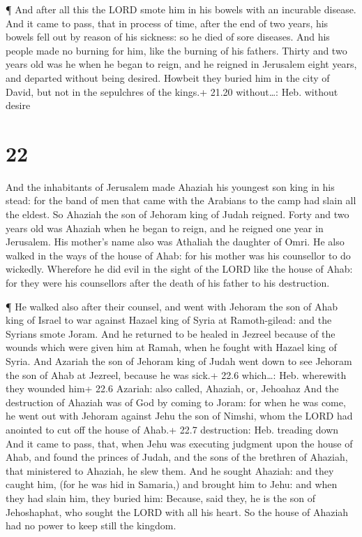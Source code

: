  ¶ And after all this the LORD smote him in his bowels with
an incurable disease.  And it came to pass, that in process
of time, after the end of two years, his bowels fell out by reason of
his sickness: so he died of sore diseases. And his people made no
burning for him, like the burning of his fathers.  Thirty
and two years old was he when he began to reign, and he reigned in
Jerusalem eight years, and departed without being desired. Howbeit they
buried him in the city of David, but not in the sepulchres of the
kings.+ 21.20 without\ldots: Heb. without desire

\hypertarget{section-21}{%
\section{22}\label{section-21}}

 And the inhabitants of Jerusalem made Ahaziah his youngest
son king in his stead: for the band of men that came with the Arabians
to the camp had slain all the eldest. So Ahaziah the son of Jehoram king
of Judah reigned.  Forty and two years old was Ahaziah when
he began to reign, and he reigned one year in Jerusalem. His mother's
name also was Athaliah the daughter of Omri.  He also walked
in the ways of the house of Ahab: for his mother was his counsellor to
do wickedly.  Wherefore he did evil in the sight of the LORD
like the house of Ahab: for they were his counsellors after the death of
his father to his destruction.

 ¶ He walked also after their counsel, and went with Jehoram
the son of Ahab king of Israel to war against Hazael king of Syria at
Ramoth-gilead: and the Syrians smote Joram.  And he returned
to be healed in Jezreel because of the wounds which were given him at
Ramah, when he fought with Hazael king of Syria. And Azariah the son of
Jehoram king of Judah went down to see Jehoram the son of Ahab at
Jezreel, because he was sick.+ 22.6 which\ldots: Heb. wherewith they
wounded him+ 22.6 Azariah: also called, Ahaziah, or, Jehoahaz
 And the destruction of Ahaziah was of God by coming to
Joram: for when he was come, he went out with Jehoram against Jehu the
son of Nimshi, whom the LORD had anointed to cut off the house of Ahab.+
22.7 destruction: Heb. treading down  And it came to pass,
that, when Jehu was executing judgment upon the house of Ahab, and found
the princes of Judah, and the sons of the brethren of Ahaziah, that
ministered to Ahaziah, he slew them.  And he sought Ahaziah:
and they caught him, (for he was hid in Samaria,) and brought him to
Jehu: and when they had slain him, they buried him: Because, said they,
he is the son of Jehoshaphat, who sought the LORD with all his heart. So
the house of Ahaziah had no power to keep still the kingdom.

